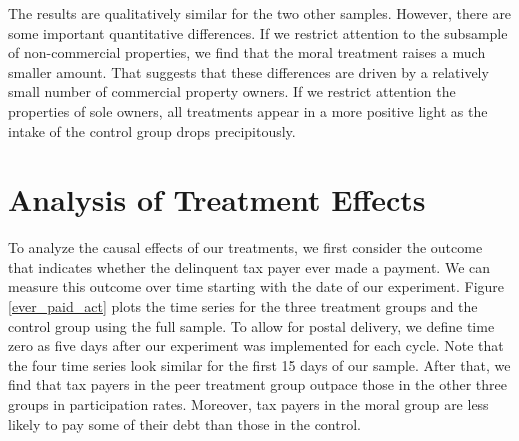 \documentclass[12pt,titlepage]{article}
\begin{document}
The results are qualitatively similar for the two other
samples. However, there are some important quantitative
differences. If we restrict attention to the subsample of
non-commercial properties, we find that the moral treatment raises a
much smaller amount. That suggests that these differences are driven
by a relatively small number of commercial property owners.  If we
restrict attention the properties of sole owners, all treatments 
appear in a more positive light as the intake of the control group
drops precipitously.



\section{Analysis of Treatment Effects}

To analyze the causal effects of our treatments, we first consider the
outcome that indicates whether the delinquent tax payer ever made a
payment.  We can measure this outcome over time starting with the date
of our experiment. Figure \ref{ever_paid_act} plots the time series
for the three treatment groups and the control group using the full
sample. To allow for postal delivery, we define time zero as five days
after our experiment was implemented for each cycle.  Note that the four time series look similar for
the first 15 days of our sample.  After that, we find that tax payers
in the peer treatment group outpace those in the other three
groups in participation rates. Moreover, tax payers in the moral group are less likely to pay
some of their debt than those in the control.
\end{document}
